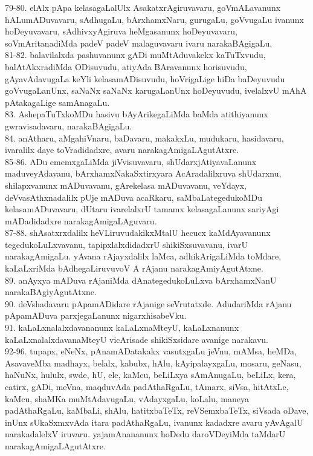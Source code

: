 \documentclass{article}
\begin{document}
79-80. elAlx pApa kelasagaLalUlx AsakatxrAgiruvavaru, goVmALavanunx hALumADuvavaru, sAdhugaLu, bArxhamxNaru, gurugaLu, goVvugaLu ivanunx hoDeyuvavaru, sAdhivxyAgiruva heMgasanunx hoDeyuvavaru, soVmAritanadiMda padeV padeV malaguvavaru ivaru narakaBAgigaLu.\\
81-82. balavilalxda pashuvanunx gADi muMtAduvakekx kaTuTxvudu, balAtAkxradiMda ODisuvudu, atiyAda BAravanunx horisuvudu, gAyavAdavugaLa keYli kelasamADisuvudu, hoVrigaLige hiDa baDeyuvudu goVvugaLanUnx, saNaNx saNaNx karugaLanUnx hoDeyuvudu, ivelalxvU mAhA pAtakagaLige samAnagaLu.\\
83. AshepaTuTxkoMDu hasivu bAyArikegaLiMda baMda atithiyanunx gwravisadavaru, narakaBAgigaLu.\\
84. anAtharu, aMgahiVnaru, baDavaru, makakxLu, mudukaru, hasidavaru, ivaralilx daye toVradidadxre, avaru narakagAmigaLAgutAtxre.\\
85-86. ADu ememxgaLiMda jiVvisuvavaru, shUdarxjAtiyavaLanunx maduveyAdavanu, bArxhamxNakaSxtirxyara AcAradalilxruva shUdarxnu, shilapxvanunx mADuvavanu, gArekelasa mADuvavanu, veYdayx, deVvasAthxnadalilx pUje mADuva acaRkaru, saMbaLategedukoMDu kelasamADuvavaru, dUtaru ivarelalxrU tamamx kelasagaLanunx sariyAgi mADadidadxre narakagAmigaLAguvaru.\\
87-88. shAsatxrxdalilx heVLiruvudakikxMtalU hecucx kaMdAyavanunx tegedukoLuLxvavanu, tapipxlalxdidadxrU shikiSxsuvavanu, ivarU narakagAmigaLu. yAvana rAjayxdalilx laMca, adhikArigaLiMda toMdare, kaLaLxriMda bAdhegaLiruvuvoV A rAjanu narakagAmiyAgutAtxne.\\
89. anAyxya mADuva rAjaniMda dAnategedukoLuLxva bArxhamxNanU narakaBAgiyAgutAtxne.\\
90. deVshadavaru pApamADidare rAjanige seVrutatxde. AdudariMda rAjanu pApamADuva parxjegaLanunx nigarxhisabeVku.\\
91. kaLaLxnalalxdavananunx kaLaLxnaMteyU, kaLaLxnanunx kaLaLxnalalxdavanaMteyU vicArisade shikiSxsidare avanige narakavu.\\
92-96. tupapx, eNeNx, pAnamADatakakx vasutxgaLu jeVnu, mAMsa, heMDa, AsavaveMba madhayx, belalx, kabubx, hAlu, kAyipalayxgaLu, mosaru, geNasu, haNuNx, hululx, swde, hU, ele, kaMcu, beLiLxya sAmAnugaLu, beLiLx, kera, catirx, gADi, meVna, maqduvAda padAthaRgaLu, tAmarx, siVsa, hitAtxLe, kaMcu, shaMKa muMtAdavugaLu, vAdayxgaLu, koLalu, maneya padAthaRgaLu, kaMbaLi, shAlu, hatitxbaTeTx, reVSemxbaTeTx, siVsada oDave, inUnx sUkaSxmxvAda itara padAthaRgaLu, ivanunx kadadxre avaru yAvAgalU narakadalelxV iruvaru. yajamAnananunx hoDedu daroVDeyiMda taMdarU narakagAmigaLAgutAtxre.\\
\end{document}
